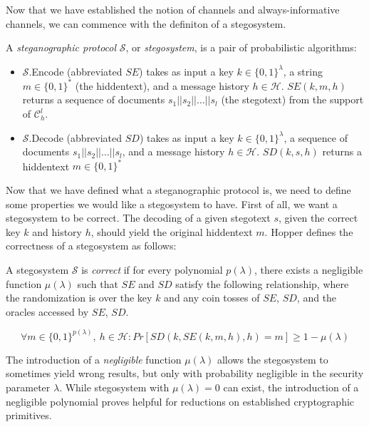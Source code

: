 Now that we have established the notion of channels and always-informative channels, we can commence with the definiton of a stegosystem.

\begin{definition}
\label{def:stegosystem}
A \emph{steganographic protocol} $\mathcal{S}$, or \emph{stegosystem}, is a pair of probabilistic algorithms:

\begin{itemize}
	\item $\mathcal{S}$.Encode (abbreviated $SE$) takes as input a key $k \in \{0,1\}^\lambda$, a string $m \in \{0,1\}^*$ (the hiddentext), and a message history $h \in \mathcal{H}$.
		$SE(k, m, h)$ returns a sequence of documents $s_1||s_2||\dots||s_l$ (the stegotext) from the support of $\mathcal{C}_h^l$.
	\item $\mathcal{S}$.Decode (abbreviated $SD$) takes as input a key $k \in \{0,1\}^\lambda$, a sequence of documents $s_1||s_2||\dots||s_l$, and a message history $h \in \mathcal{H}$.
		$SD(k, s, h)$ returns a hiddentext $m \in \{0,1\}^*$
\end{itemize}
\end{definition}

Now that we have defined what a steganographic protocol is, we need to define some properties we would like a stegosystem to have.
First of all, we want a stegosystem to be correct.
The decoding of a given stegotext $s$, given the correct key $k$ and history $h$, should yield the original hiddentext $m$.
Hopper defines the correctness of a stegosystem as follows:

\begin{definition}
\label{def:correctness-hopper}
A stegosystem $\mathcal{S}$ is \emph{correct} if for every polynomial $p(\lambda)$, there exists a negligible function $\mu(\lambda)$ such that $SE$ and $SD$ satisfy the following relationship, where the randomization is over the key $k$ and any coin tosses of $SE$, $SD$, and the oracles accessed by $SE$, $SD$.

$$\forall m \in \{0,1\}^{p(\lambda)},~ h \in \mathcal{H} \colon Pr[SD(k, SE(k, m, h), h) = m] \geq 1 - \mu(\lambda)$$

\end{definition}

The introduction of a \emph{negligible} function $\mu(\lambda)$ allows the stegosystem to sometimes yield wrong results, but only with probability negligible in the security parameter $\lambda$.
While stegosystem with $\mu(\lambda) = 0$ can exist, the introduction of a negligible polynomial proves helpful for reductions on established cryptographic primitives.

